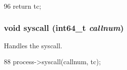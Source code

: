 \begin{DoxyCode}
96 { return tc; }
\end{DoxyCode}
\hypertarget{classInOrderThreadState_a36e0b96120fcbbc2ee8699158f7be5c2}{
\subsubsection[{syscall}]{\setlength{\rightskip}{0pt plus 5cm}void syscall (int64\_\-t {\em callnum})}}
\label{classInOrderThreadState_a36e0b96120fcbbc2ee8699158f7be5c2}
Handles the syscall. 


\begin{DoxyCode}
88 { process->syscall(callnum, tc); }
\end{DoxyCode}


